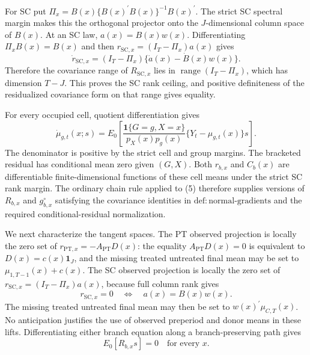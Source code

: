 For SC put \(\Pi_x=B(x)\{B(x)^{\prime}B(x)\}^{-1}B(x)^{\prime}\).  The strict SC spectral margin makes this the orthogonal projector onto the \(J\)-dimensional column space of \(B(x)\).  At an SC law, \(a(x)=B(x)w(x)\).  Differentiating \(\Pi_xB(x)=B(x)\) and then \(r_{\mathrm{SC},x}=(I_T-\Pi_x)a(x)\) gives
\[
 \dot r_{\mathrm{SC},x}
 =(I_T-\Pi_x)\{\dot a(x)-\dot B(x)w(x)\}.
 \tag{4}
\]
Therefore the covariance range of \(R_{\mathrm{SC},x}\) lies in \(\operatorname{range}(I_T-\Pi_x)\), which has dimension \(T-J\).  This proves the SC rank ceiling, and positive definiteness of the residualized covariance form on that range gives equality.

For every occupied cell, quotient differentiation gives
\[
 \dot\mu_{g,t}(x;s)
 =E_0\!\left[
 \frac{\mathbf 1\{G=g,X=x\}}{p_X(x)p_g(x)}
 \{Y_t-\mu_{g,t}(x)\}s\right].
 \tag{5}
\]
The denominator is positive by the strict cell and group margins.  The bracketed residual has conditional mean zero given \((G,X)\).  Both \(r_{b,x}\) and \(C_b(x)\) are differentiable finite-dimensional functions of these cell means under the strict SC rank margin.  The ordinary chain rule applied to (5) therefore supplies versions of \(R_{b,x}\) and \(g^{\circ}_{b,x}\) satisfying the covariance identities in \(\mathrm{def{:}normal\text{-}gradients}\) and the required conditional-residual normalization.

We next characterize the tangent spaces.  The PT observed projection is locally the zero set of \(r_{\mathrm{PT},x}=-A_{\mathrm{PT}}D(x)\): the equality \(A_{\mathrm{PT}}D(x)=0\) is equivalent to \(D(x)=c(x)\mathbf 1_J\), and the missing treated untreated final mean may be set to \(\mu_{1,T-1}(x)+c(x)\).  The SC observed projection is locally the zero set of \(r_{\mathrm{SC},x}=(I_T-\Pi_x)a(x)\), because full column rank gives
\[
 r_{\mathrm{SC},x}=0
 \quad\Longleftrightarrow\quad
 a(x)=B(x)w(x).
 \tag{6}
\]
The missing treated untreated final mean may then be set to \(w(x)^{\prime}\mu_{C,T}(x)\).  No anticipation justifies the use of observed preperiod and donor means in these lifts.  Differentiating either branch equation along a branch-preserving path gives
\[
 E_0[R_{b,x}s]=0
 \quad\text{for every }x.
 \tag{7}
\]

